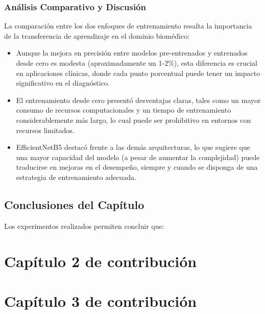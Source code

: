 \documentclass[11pt,spanish,listoffigures,listoftables]{tfgetsinf}
\begin{document}
\subsection{Análisis Comparativo y Discusión}
La comparación entre los dos enfoques de entrenamiento resalta la importancia de la transferencia de aprendizaje en el dominio biomédico:
\begin{itemize}
    \item Aunque la mejora en precisión entre modelos pre-entrenados y entrenados desde cero es modesta (aproximadamente un 1-2\%), esta diferencia es crucial en aplicaciones clínicas, donde cada punto porcentual puede tener un impacto significativo en el diagnóstico.
    \item El entrenamiento desde cero presentó desventajas claras, tales como un mayor consumo de recursos computacionales y un tiempo de entrenamiento considerablemente más largo, lo cual puede ser prohibitivo en entornos con recursos limitados.
    \item EfficientNetB5 destacó frente a las demás arquitecturas, lo que sugiere que una mayor capacidad del modelo (a pesar de aumentar la complejidad) puede traducirse en mejoras en el desempeño, siempre y cuando se disponga de una estrategia de entrenamiento adecuada.
\end{itemize}

\section{Conclusiones del Capítulo}
Los experimentos realizados permiten concluir que:

\cleardoublepage


\chapter{Capítulo 2 de contribución}   %


\chapter{Capítulo 3 de contribución}   %
\end{document}
